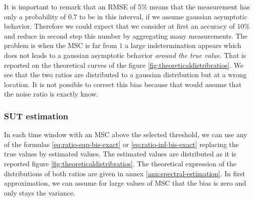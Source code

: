   \newpage
 It is important to remark that an RMSE of 5\% means that the measurement has only a probability of $0.7$ to be in this interval, if we assume gaussian asymptotic behavior. Therefore we could expect that we consider at first an accuracy of $10\%$ and reduce in second step this number by aggregating many measurements. The problem is when the MSC is far from $1$ a large indetermination appears which does not leads to a gaussian asymptotic behavior \emph{around the true value}. That is reported on the theoretical curves of the figure \ref{fig:theoreticaldistribratios}. We see that the two ratios are distributed to a gaussian distribution but at a wrong location. It is not possible to correct this bias because that would assume that  the noise ratio is exactly know.




\subsubsection{SUT estimation}
In each time window with an MSC above the selected threshold, we can use any of the formulas \eqref{eq:ratio-sup-bis-exact} or  \eqref{eq:ratio-inf-bis-exact} replacing the true values by estimated values. The estimated values are distributed as it is reported figure \ref{fig:theoreticaldistribratios}.  The theoretical expression of the distributions of both ratios are given in annex \ref{ann:spectral-estimation}. In first approximation, we can assume for large values of MSC that the bias is zero and only stays the variance.

